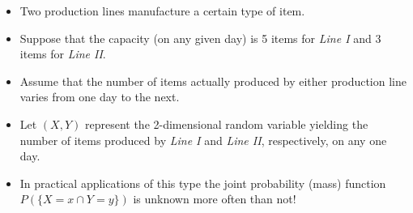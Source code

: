 \documentclass[notes=show,handout]{beamer}\usepackage[]{graphicx}\usepackage[]{color}
\renewcommand{\Pr}{P}
\begin{document}
\begin{frame}{\secname}

  \begin{example}
  \begin{footnotesize}
  \begin{itemize}
  \item Two production lines manufacture a certain type of item.

  \item Suppose that the capacity (on any given day) is 5 items for \emph{Line
  I }and 3 items for \emph{Line II}.

  \item Assume that the number of items actually produced by either production
  line varies from one day to the next.

  \item Let $(X,Y)$ represent the 2-dimensional random variable yielding the
  number of items produced by \emph{Line I} and \emph{Line II}, respectively,
  on any one day.

  \item In practical applications of this type the joint probability (mass)
  function $\Pr(\{X=x\cap Y=y\})$ is unknown more often than not!
  \end{itemize}
  \end{footnotesize}
  \end{example}
\end{frame}
\end{document}
